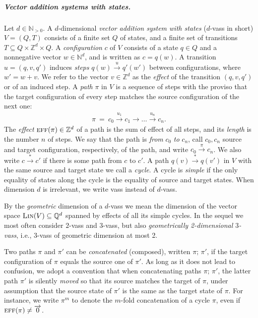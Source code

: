 \documentclass[a4paper, UKenglish, cleveref, autoref, thm-restate]{lipics-v2021}
\newcommand{\N}{\mathbb{N}}
\newcommand{\Z}{\mathbb{Z}}
\newcommand{\Q}{\mathbb{Q}}
\newcommand{\trans}[1]{\stackrel{#1}{\longrightarrow}}
\newcommand{\tran}{\trans{*}}
\newcommand{\eff}{\textsc{eff}}
\renewcommand{\vec}[1]{\overrightarrow{#1}}
\newcommand{\Lin}[1]{\textsc{Lin}(#1)}
\newcommand{\vass}{{\sc vass}\xspace}
\newcommand{\dvass}{\parvass 2}
\newcommand{\tvass}{\parvass 3}
\newcommand{\geomvass}{geometrically 2-dimensional \tvass}
\newcommand{\parvass}[1]{{$#1$-\vass}\xspace}
\newcommand{\para}[1]{\vspace{-3mm}\subparagraph*{\bf #1.}}
\newcommand{\Npos}{\N_{>0}}
\begin{document}
\para{Vector addition systems with states}

Let $d\in\Npos$.
A $d$-dimensional \emph{vector addition system with states} (\parvass d in short) $V=(Q,T)$ consists of
a finite set $Q$ of states, and a finite set of transitions $T\subseteq Q\times \Z^d \times Q$.
A \emph{configuration} $c$ of $V$ consists of a state $q\in Q$ and a nonnegative vector $w\in\N^d$,
and is written as $c=q(w)$.
A transition $u=(q,v,q')$ induces \emph{steps} $q(w) \trans{u} q'(w')$ between configurations, where $w' = w+v$.
We refer to the vector $v\in\Z^d$ as the \emph{effect} of the transition $(q,v,q')$ or of an induced step.
A \emph{path} $\pi$ in $V$ is a sequence of steps with the proviso that the target configuration of every step matches
the source configuration of the next one:
\begin{align} \label{eq:path}
\pi \ = \ c_0 \trans{u_1} c_1 \trans{} \ldots \trans{u_n} c_n.
\end{align}
The \emph{effect} $\eff(\pi)\in\Z^d$
of a path is the sum of effect of all steps, and its \emph{length} is the number $n$ of steps.
We say that the path is \emph{from} $c_0$ \emph{to} $c_n$, call $c_0, c_n$ source and target 
configuration, respectively, of the path, and write $c_0\trans{\pi}c_n$.
We also write $c \tran c'$ if there is some path from $c$ to $c'$.
A path $q(v) \tran q(v')$ in $V$ with the same source and target state
we call a \emph{cycle}.
A cycle is \emph{simple} if the only equality of states along the cycle is the equality of source and target states.
When dimension $d$ is irrelevant, we write \vass instead of \parvass d.

By the \emph{geometric} dimension of a \parvass d we mean the dimension of the vector
space $\Lin V \subseteq \Q^d$ spanned by effects of all its simple cycles.
In the sequel we most often consider \dvass and \tvass, but also \emph{\geomvass}, i.e.,
\tvass of geometric dimension at most 2.

Two paths $\pi$ and $\pi'$ can be \emph{concatenated} (composed), written $\pi; \, \pi'$, if
the target configuration of $\pi$ equals the source one of $\pi'$.
As long as it does not lead to confusion, 
we adopt a convention that when concatenating paths $\pi;\,\pi'$, 
the latter path $\pi'$ is silently \emph{moved}
so that its source matches the target of $\pi$, 
under assumption that the source state of $\pi'$ is the same as the target state of $\pi$.
For instance, we write $\pi^m$ to denote the $m$-fold concatenation of a cycle $\pi$, even if $\eff(\pi)\neq\vec 0$.
\end{document}
